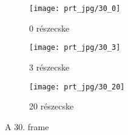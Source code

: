 \begin{figure}[!htb]
    \centering
    \begin{subfigure}[!htb]{0.32\textwidth}
        \centering
        \texttt{[image: prt\_jpg/30\_0]}
        \caption{0 részecske}
    \end{subfigure}
    \hfill
    \begin{subfigure}[!htb]{0.32\textwidth}
        \centering
        \texttt{[image: prt\_jpg/30\_3]}
        \caption{3 részecske}
    \end{subfigure}
    \hfill
    \begin{subfigure}[!htb]{0.32\textwidth}
        \centering
        \texttt{[image: prt\_jpg/30\_20]}
        \caption{20 részecske}
    \end{subfigure}
    \caption{A 30. frame}
    \label{fig:x frame30}
\end{figure}





